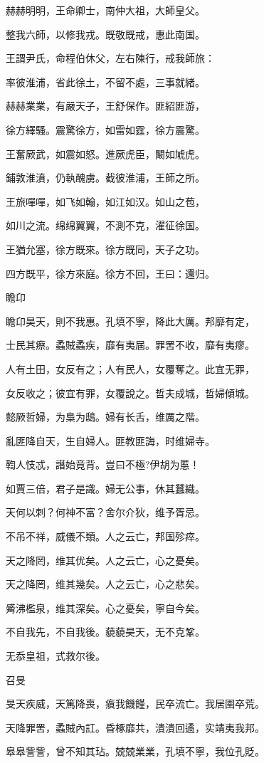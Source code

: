 赫赫明明，王命卿士，南仲大祖，大師皇父。

整我六師，以修我戎。既敬既戒，惠此南国。

王謂尹氏，命程伯休父，左右陳行，戒我師旅：

率彼淮浦，省此徐土，不留不處，三事就緒。

赫赫業業，有嚴天子，王舒保作。匪紹匪游，

徐方繹騷。震驚徐方，如雷如霆，徐方震驚。

王奮厥武，如震如怒。進厥虎臣，闞如虓虎。

鋪敦淮濆，仍執醜虜。截彼淮浦，王師之所。

王旅嘽嘽，如飞如翰，如江如汉。如山之苞，

如川之流。绵绵翼翼，不測不克，濯征徐国。

王猶允塞，徐方既來。徐方既同，天子之功。

四方既平，徐方來庭。徐方不回，王曰：還归。

瞻卬

瞻卬昊天，則不我惠。孔填不寧，降此大厲。邦靡有定，

士民其瘵。蟊賊蟊疾，靡有夷屆。罪罟不收，靡有夷瘳。

人有土田，女反有之；人有民人，女覆奪之。此宜无罪，

女反收之；彼宜有罪，女覆說之。哲夫成城，哲婦傾城。

懿厥哲婦，为梟为鴟。婦有长舌，维厲之階。

亂匪降自天，生自婦人。匪教匪誨，时维婦寺。

鞫人忮忒，譖始竟背。豈曰不極?伊胡为慝！

如賈三倍，君子是識。婦无公事，休其蠶織。

天何以刺？何神不富？舍尔介狄，维予胥忌。

不吊不祥，威儀不類。人之云亡，邦国殄瘁。

天之降罔，维其优矣。人之云亡，心之憂矣。

天之降罔，维其幾矣。人之云亡，心之悲矣。

觱沸檻泉，维其深矣。心之憂矣，寧自今矣。

不自我先，不自我後。藐藐昊天，无不克鞏。

无忝皇祖，式救尔後。

召旻

旻天疾威，天篤降喪，瘨我饑饉，民卒流亡。我居圉卒荒。

天降罪罟，蟊賊內訌。昏椓靡共，潰潰回遹，实靖夷我邦。

皋皋訾訾，曾不知其玷。兢兢業業，孔填不寧，我位孔貶。

